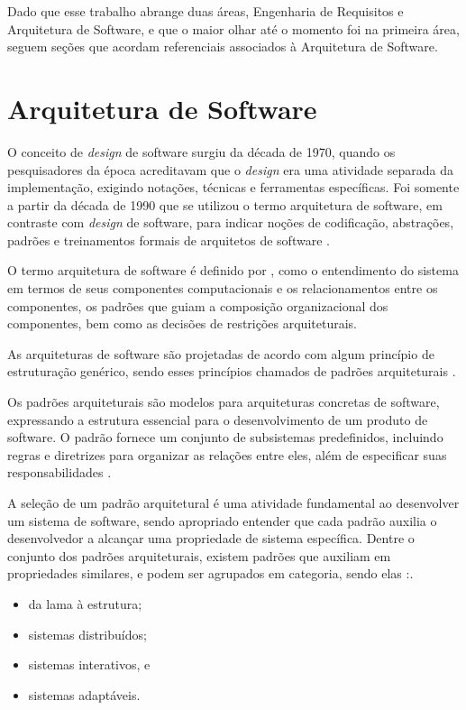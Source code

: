Dado que esse trabalho abrange duas áreas, Engenharia de Requisitos e Arquitetura de Software, e que o maior olhar até o momento foi na primeira área, seguem seções que acordam referenciais associados à Arquitetura de Software. 

\section{Arquitetura de Software}
\label{sec:arquitetura}

O conceito de \textit{design} de software surgiu da década de 1970, quando os pesquisadores da época acreditavam que o \textit{design} era uma atividade separada da implementação, exigindo notações, técnicas e ferramentas específicas. Foi somente a partir da década de 1990 que se utilizou o termo arquitetura de software, em contraste com \textit{design} de software, para indicar noções de codificação, abstrações, padrões e treinamentos formais de arquitetos de software \cite{perry1992foundations}.

O termo arquitetura de software é definido por \cite{shaw1996software}, como o entendimento do sistema em termos de seus componentes computacionais e os relacionamentos entre os componentes, os padrões que guiam a composição organizacional dos componentes, bem como as decisões de restrições arquiteturais. 

As arquiteturas de software são projetadas de acordo com algum princípio de estruturação genérico, sendo esses princípios chamados de padrões arquiteturais \cite{buschmann1996system}. 

Os padrões arquiteturais são modelos para arquiteturas concretas de software, expressando a estrutura essencial para o desenvolvimento de um produto de software. O padrão fornece um conjunto de subsistemas predefinidos, incluindo regras e diretrizes para organizar as relações entre eles, além de especificar suas responsabilidades \cite{buschmann1996system}. 

A seleção de um padrão arquitetural é uma atividade fundamental ao desenvolver um sistema de software, sendo apropriado entender que cada padrão auxilia o desenvolvedor a alcançar uma propriedade de sistema específica. Dentre o conjunto dos padrões arquiteturais, existem padrões que auxiliam em propriedades similares, e podem ser agrupados em categoria, sendo elas \cite{buschmann1996system}:.

\begin{itemize}
	
	\item da lama à estrutura;
	
	\item sistemas distribuídos;
	
	\item sistemas interativos, e
	
	\item sistemas adaptáveis.

\end{itemize}

